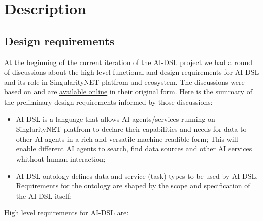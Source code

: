 \documentclass[]{report}
\begin{document}
\section{Description}

\subsection{Design requirements}

At the beginning of the current iteration of the AI-DSL project we had a round of discussions about the high level functional and design requirements for AI-DSL and its role in SingularityNET platfrom and ecosystem. The discussions were based on \cite{GoertzelGeisweillerBlog,singularitynet_foundation_phasetwo_2021}  and are \href{https://github.com/nunet-io/ai-dsl-ontology/wiki/AI-DSL\%20requirements}{available online} in their original form. Here is the summary of the preliminary design requirements informed by those discussions:

\begin{itemize}
  \item AI-DSL is a language that allows AI agents/services running on SinglarityNET platfrom to declare their capabilities and needs for data to other AI agents in a rich and versatile machine readible form; This will enable different AI agents to search, find data sources and other AI services whithout human interaction;
  \item AI-DSL ontology defines data and service (task) types to be used by AI-DSL. Requirements for the ontology are shaped by the scope and specification of the AI-DSL itself;
\end{itemize}

High level requirements for AI-DSL are:
\end{document}
